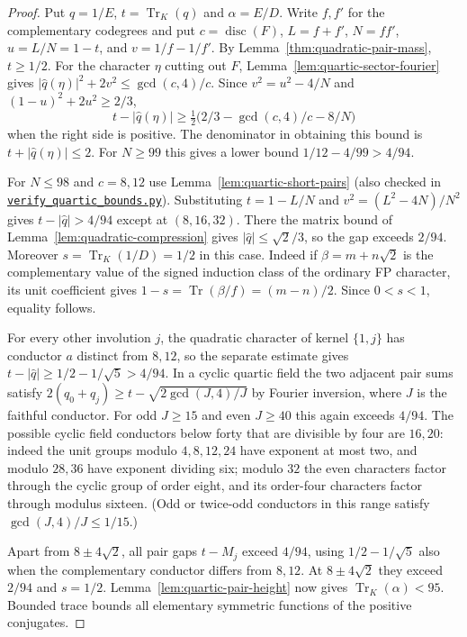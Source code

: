 \documentclass[11pt,reqno]{amsart}
\newcommand{\codefile}[1]{\href{https://github.com/sebastienpalcoux/grothendieck-ring-classification/blob/d5750105bb5758f3ad38d2e5464dfcc12c019816/supplements/rank6/sphericality/#1}{\nolinkurl{#1}}}
\theoremstyle{remark}\newtheorem{remark}[theorem]{Remark}
\numberwithin{equation}{section}
\begin{document}
\begin{proof}
Put $q=1/E$, $t=\operatorname{Tr}_K(q)$ and $\alpha=E/D$.
Write $f,f'$ for the complementary codegrees and put $c=\operatorname{disc}(F)$,
$L=f+f'$, $N=ff'$, $u=L/N=1-t$, and $v=1/f-1/f'$.
By Lemma~\ref{thm:quadratic-pair-mass}, $t\ge1/2$.
For the character $\eta$ cutting out $F$,
Lemma~\ref{lem:quartic-sector-fourier} gives
$|\widehat q(\eta)|^2+2v^2\le\gcd(c,4)/c$.
Since $v^2=u^2-4/N$ and $(1-u)^2+2u^2\ge2/3$,
\[
 t-|\widehat q(\eta)|\ge\tfrac12\bigl(2/3-\gcd(c,4)/c-8/N\bigr)
\]
when the right side is positive. The denominator in obtaining this
bound is $t+|\widehat q(\eta)|\le2$. For $N\ge99$ this gives a lower bound $1/12-4/99>4/94$.

For $N\le98$ and $c=8,12$ use Lemma~\ref{lem:quartic-short-pairs}
(also checked in \codefile{verify_quartic_bounds.py}).
Substituting $t=1-L/N$ and
$v^2=(L^2-4N)/N^2$ gives $t-|\widehat q|>4/94$ except at
$(8,16,32)$. There the matrix bound of
Lemma~\ref{lem:quadratic-compression} gives
$|\widehat q|\le\sqrt2/3$, so the gap exceeds $2/94$.
Moreover $s=\operatorname{Tr}_K(1/D)=1/2$ in this case.
Indeed if $\beta=m+n\sqrt2$ is the complementary value of the
signed induction class of the ordinary FP character, its unit
coefficient gives $1-s=\operatorname{Tr}(\beta/f)=(m-n)/2$.
Since $0<s<1$, equality follows.

For every other involution $j$, the quadratic character of kernel
$\{1,j\}$ has conductor $a$ distinct from $8,12$, so the separate
estimate gives $t-|\widehat q|\ge1/2-1/\sqrt5>4/94$. In a cyclic
quartic field the two adjacent pair sums satisfy
$2(q_0+q_j)\ge t-\sqrt{2\gcd(J,4)/J}$ by Fourier inversion,
where $J$ is the faithful conductor. For odd $J\ge15$ and even
$J\ge40$ this again exceeds $4/94$. The possible cyclic field
conductors below forty that are divisible by four are $16,20$:
indeed the unit groups modulo $4,8,12,24$ have exponent at most two,
and modulo $28,36$ have exponent dividing six; modulo $32$ the even
characters factor through the cyclic group of order eight, and its
order-four characters factor through modulus sixteen. (Odd or
twice-odd conductors in this range satisfy $\gcd(J,4)/J\le1/15$.)

Apart from $8\pm4\sqrt2$, all pair gaps $t-M_j$ exceed $4/94$,
using $1/2-1/\sqrt5$ also when the complementary conductor differs
from $8,12$. At $8\pm4\sqrt2$ they exceed $2/94$ and $s=1/2$.
Lemma~\ref{lem:quartic-pair-height} now gives
$\operatorname{Tr}_K(\alpha)<95$. Bounded trace bounds all elementary
symmetric functions of the positive conjugates.
\end{proof}
\end{document}
